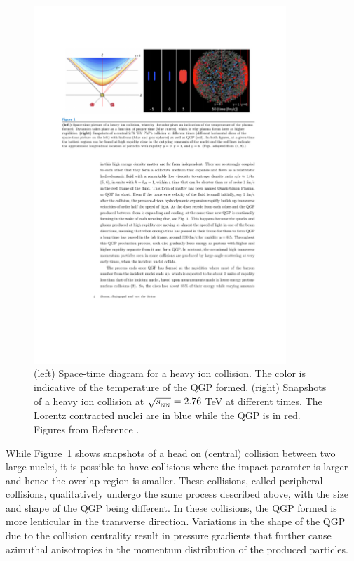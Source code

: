 \begin{figure}[htbp]
\begin{center}
\includegraphics[width=0.85\textwidth]{figures/theory/qgp_formation}
\caption{(left) Space-time diagram for a heavy ion collision. The color is indicative of the temperature of the QGP formed. (right) Snapshots of a heavy ion collision at $\mbox{$\sqrt{s_{_\text{NN}}}$} = 2.76$ TeV at different times. The Lorentz contracted nuclei are in blue while the QGP is in red. Figures from Reference \cite{}.  }
\label{fig:qgp_form}
\end{center}
\end{figure}

While Figure~\ref{fig:qgp_form} shows snapshots of a head on (central) collision between two large nuclei, it is possible to have collisions where the impact paramter is larger and hence the overlap region is smaller. These collisions, called peripheral collisions, qualitatively undergo the same process described above, with the size and shape of the QGP being different. In these collisions, the QGP formed is more lenticular in the transverse direction. Variations in the shape of the QGP due to the collision centrality result in pressure gradients that further cause azimuthal anisotropies in the momentum distribution of the produced particles. 
